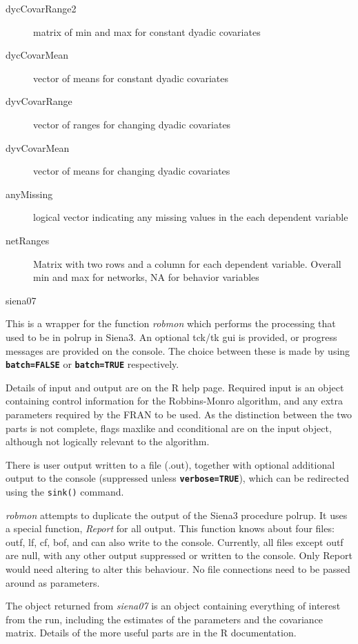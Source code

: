 \documentclass[12pt,a4paper]{article}
\makeatletter
\renewcommand{\=}{\,=\,}
\newcommand{\+}{\,+\,}
\newcommand{\nm}[1]{\textsf{\small #1}}
\newcommand{\nnm}[1]{\textsf{\small\textit{#1}}}
\newcommand{\nmm}[1]{\nnm{#1}}
\renewcommand{\section}{\@startsection{section}{1}
                {0pt}{\baselineskip}{0.5\baselineskip}
                {\centering\sffamily} }
\newcommand{\sfn}[1]{\textbf{\texttt{#1}}}
\newcommand{\R}{{\sf R }}
\newcommand{\SI}{{\sf Siena3 }}
\newcommand{\Sn}{{\sf Siena3}}
\makeatother
\begin{document}
\begin{description}
\item[dycCovarRange2] matrix of min and max for constant dyadic covariates
\item[dycCovarMean] vector of means for constant dyadic covariates
\item[dyvCovarRange] vector of ranges for changing dyadic covariates
\item[dyvCovarMean] vector of means for changing dyadic covariates
\item[anyMissing] logical vector indicating any missing values in the each
  dependent variable
\item[netRanges] Matrix with two rows and a column for each dependent
  variable. Overall min and max for networks, NA for behavior variables
\end{description}


\section{siena07}

This is a wrapper for the function \nmm{robmon} which performs the processing
that used to be in \nm{polrup} in \Sn.  An optional tck/tk gui is provided,
or progress messages are provided on the console. The choice between these is
made by using \sfn{batch=FALSE} or \sfn{batch=TRUE} respectively.

Details of input and output are on the \R help page. Required input is an object
containing control information for the Robbins-Monro algorithm, and any extra
parameters required by the \nm{FRAN} to be used. As the distinction between the
two parts is not complete, flags \nm{maxlike} and \nm{cconditional} are on the
input object, although not logically relevant to the algorithm.

There is user output written to a file (.out), together with optional additional
output to the console (suppressed unless \sfn{verbose=TRUE}), which can be
redirected using the \verb|sink()| command.

\nnm{robmon} attempts to duplicate the output of
the \SI procedure \nm{polrup}. It uses
a special function, \nnm{Report} for all output.
This function knows about four files:
\nm{outf}, \nm{lf}, \nm{cf}, \nm{bof}, and can also write to the console.
Currently, all files except \nm{outf} are null, with any other output suppressed
or written to the console. Only \nm{Report} would need altering to alter this
behaviour.  No file connections need to be passed around as parameters.

The object returned from \nnm{siena07} is an object containing everything of
interest from the run, including the estimates of the parameters and the
covariance matrix.  Details of the more useful parts are in the \R
documentation.
\end{document}

